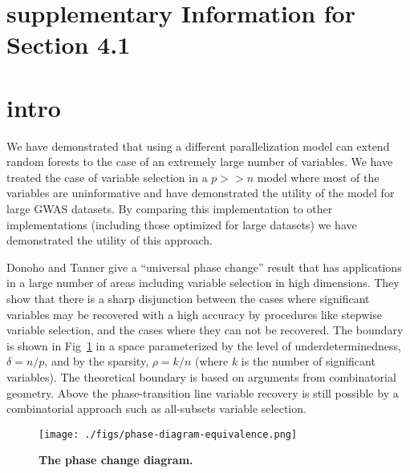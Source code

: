 




\section{supplementary Information for Section 4.1}




\section{intro}

We have demonstrated that using a different parallelization model can extend random forests to the case of an
extremely large number of variables. We have treated the case of variable selection in a $p >> n$ model where most of
the variables are uninformative and have demonstrated the utility of the model for large GWAS datasets. By comparing
this implementation to other implementations (including those optimized for large datasets) we have demonstrated the
utility of this approach.

Donoho and Tanner \cite{Donoho.and.Tanner.2009} give a ``universal phase change'' result that has applications in a
large number of areas including variable selection in high dimensions. They show that there is a sharp disjunction
between the cases where significant variables may be recovered with a high accuracy by procedures like stepwise variable
selection, and the cases where they can not be recovered. The boundary is shown in
Fig~\ref{figure:phase-diagram-equivalence.png} in a space parameterized by the level of underdeterminedness,
$\delta = n/p$, and by the sparsity, $\rho =k/n$ (where $k$ is the number of significant variables). The theoretical
boundary is based on arguments from combinatorial geometry. Above the phase-transition line variable recovery is still
possible by a combinatorial approach such as all-subsets variable selection. 




\begin{figure}[tbhp] 
    \centering
    \texttt{[image: ./figs/phase-diagram-equivalence.png]} 
    \caption{{\bf The phase change diagram.}}
    \label{figure:phase-diagram-equivalence.png} 
    \vspace{4ex}
\end{figure}


